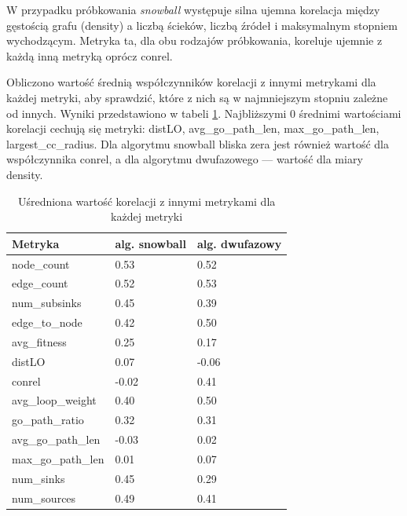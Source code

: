 W przypadku próbkowania \textit{snowball} występuje silna ujemna korelacja między gęstością grafu (density) a liczbą ścieków, liczbą źródeł i maksymalnym stopniem wychodzącym.
Metryka ta, dla obu rodzajów próbkowania, koreluje ujemnie z każdą inną metryką oprócz conrel.

Obliczono wartość średnią współczynników korelacji z innymi metrykami dla każdej metryki, aby sprawdzić, które z nich
są w najmniejszym stopniu zależne od innych. Wyniki przedstawiono w tabeli \ref{tab:meancorr}.
Najbliższymi 0 średnimi wartościami korelacji cechują się metryki: distLO, avg\_go\_path\_len, max\_go\_path\_len, largest\_cc\_radius.
Dla algorytmu snowball bliska zera jest również wartość dla współczynnika conrel, a dla algorytmu dwufazowego --- wartość dla miary density.

\begin{table}[]
    \centering
    \caption{Uśredniona wartość korelacji z innymi metrykami dla każdej metryki}
    \label{tab:meancorr}
    \begin{tabular}{|l|l|l|}
        \hline
        Metryka               & alg. snowball & alg. dwufazowy \\ \hline
        node\_count           & 0.53          & 0.52           \\ \hline
        edge\_count           & 0.52          & 0.53           \\ \hline
        num\_subsinks         & 0.45          & 0.39           \\ \hline
        edge\_to\_node        & 0.42          & 0.50           \\ \hline
        avg\_fitness          & 0.25          & 0.17           \\ \hline
        distLO                & 0.07          & -0.06          \\ \hline
        conrel                & -0.02         & 0.41           \\ \hline
        avg\_loop\_weight     & 0.40          & 0.50           \\ \hline
        go\_path\_ratio       & 0.32          & 0.31           \\ \hline
        avg\_go\_path\_len    & -0.03         & 0.02           \\ \hline
        max\_go\_path\_len    & 0.01          & 0.07           \\ \hline
        num\_sinks            & 0.45          & 0.29           \\ \hline
        num\_sources          & 0.49          & 0.41           \\ \hline

\end{tabular}
\end{table}
